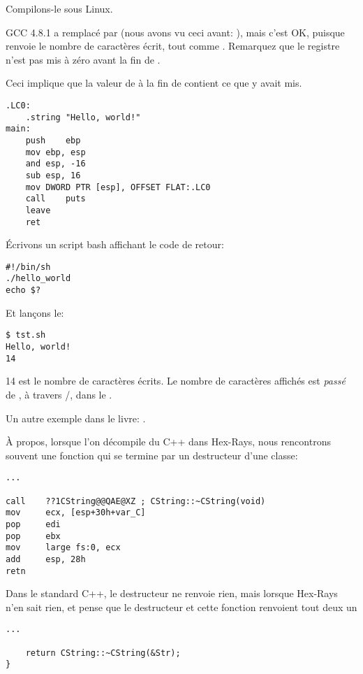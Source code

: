 Compilons-le sous Linux.

GCC 4.8.1 a remplacé \printf par \puts (nous avons vu ceci avant: ),
mais c'est OK, puisque \puts renvoie le nombre de caractères écrit, tout comme
\printf.
Remarquez que le registre \EAX n'est pas mis à zéro avant la fin de \main.

Ceci implique que la valeur de \EAX à la fin de \main contient ce que \puts y avait mis.

\begin{lstlisting}[caption=GCC 4.8.1,style=customasmx86]
.LC0:
	.string	"Hello, world!"
main:
	push	ebp
	mov	ebp, esp
	and	esp, -16
	sub	esp, 16
	mov	DWORD PTR [esp], OFFSET FLAT:.LC0
	call	puts
	leave
	ret
\end{lstlisting}


Écrivons un script bash affichant le code de retour:

\begin{lstlisting}[caption=tst.sh]
#!/bin/sh
./hello_world
echo $?
\end{lstlisting}

Et lançons le:

\begin{lstlisting}
$ tst.sh 
Hello, world!
14
\end{lstlisting}

14 est le nombre de caractères écrits.
Le nombre de caractères affichés est \textit{passé} de \printf{}, à travers /, dans le .

Un autre exemple dans le livre: .

À propos, lorsque l'on décompile du C++ dans Hex-Rays, nous rencontrons souvent
une fonction qui se termine par un destructeur d'une classe:

\begin{lstlisting}[style=customasmx86]
...

call    ??1CString@@QAE@XZ ; CString::~CString(void)
mov     ecx, [esp+30h+var_C]
pop     edi
pop     ebx
mov     large fs:0, ecx
add     esp, 28h
retn
\end{lstlisting}

Dans le standard C++, le destructeur ne renvoie rien, mais lorsque Hex-Rays n'en %
sait rien, et pense que le destructeur et cette fonction renvoient tout deux un \Tint

\begin{lstlisting}[style=customc]
...

	return CString::~CString(&Str);
}
\end{lstlisting}

